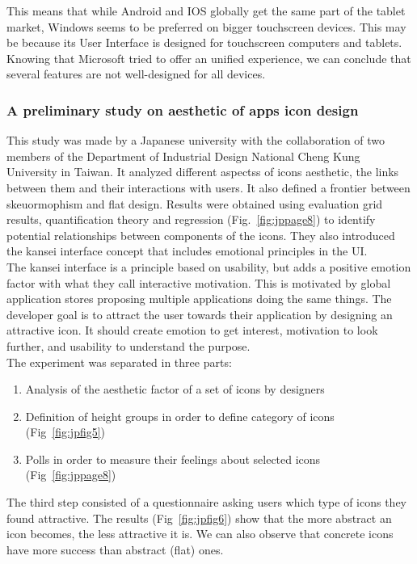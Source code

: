 \documentclass[a4paper,11pt] {article}
\theoremstyle{definition}
\begin{document}
    This means that while Android and IOS globally get the same part of the tablet market, Windows seems to be preferred on bigger touchscreen devices. This may be because its User Interface is designed for touchscreen computers and tablets. Knowing that Microsoft tried to offer an unified experience, we can conclude that several features are not well-designed for all devices.

    \subsubsection{A preliminary study on aesthetic of apps icon design}

    This study \cite{jpAnalitics} was made by a Japanese university with the collaboration of two members of the Department of Industrial Design National Cheng Kung University in Taiwan. It analyzed different aspectss of icons aesthetic, the links between them and their interactions with users. It also defined a frontier between skeuormophism and flat design. Results were obtained using evaluation grid results, quantification theory and regression (Fig.~\ref{fig:jppage8}) to identify potential relationships between components of the icons. They also introduced the kansei interface concept that includes emotional principles in the UI.\\

    The kansei interface is a principle based on usability, but adds a positive emotion factor with what they call interactive motivation. This is motivated by global application stores proposing multiple applications doing the same things. The developer goal is to attract the user towards their application by designing an attractive icon. It should create emotion to get interest, motivation to look further, and usability to understand the purpose.\\

    The experiment was separated in three parts:
    \begin{enumerate}
    \item Analysis of the aesthetic factor of a set of icons by designers
    \item Definition of height groups in order to define category of icons (Fig~\ref{fig:jpfig5})
    \item Polls in order to measure their feelings about selected icons (Fig~\ref{fig:jppage8})
    \end{enumerate}

     The third step consisted of a questionnaire asking users which type of icons they found attractive. The results (Fig~\ref{fig:jpfig6}) show that the more abstract an icon becomes, the less attractive it is. We can also observe that concrete icons have more success than abstract (flat) ones.
\end{document}
